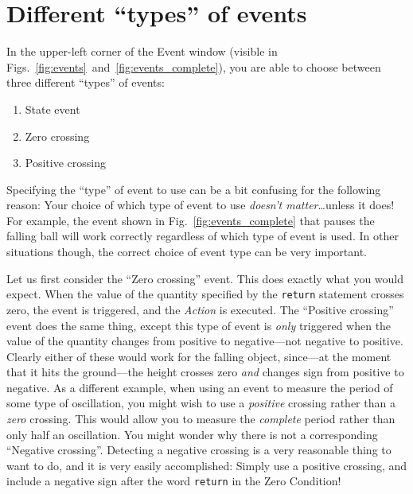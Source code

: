 \newpage
\section{Different ``types'' of events}

In the upper-left corner of the Event window (visible in Figs.~\ref{fig:events}~and~\ref{fig:events_complete}), you are able to choose between three different ``types'' of events:
\begin{enumerate}
\item State event
\item Zero crossing
\item Positive crossing
\end{enumerate}

Specifying the ``type'' of event to use can be a bit confusing for the following reason:  Your choice of which type of event to use \emph{doesn't matter}\ldots unless it does!  For example, the event shown in Fig.~\ref{fig:events_complete} that pauses the falling ball will work correctly regardless of which type of event is used.  In other situations though, the correct choice of event type can be very important.

Let us first consider the ``Zero crossing'' event.  This does exactly what you would expect.  When the value of the quantity specified by the \verb+return+ statement crosses zero, the event is triggered, and the \emph{Action} is executed.  The ``Positive crossing'' event does the same thing, except this type of event is \emph{only} triggered when the value of the quantity changes from positive to negative---not negative to positive.  Clearly either of these would work for the falling object, since---at the moment that it hits the ground---the height crosses zero \emph{and} changes sign from positive to negative.  As a different example, when using an event to measure the period of some type of oscillation, you might wish to use a \emph{positive} crossing rather than a \emph{zero} crossing.  This would allow you to measure the \emph{complete} period rather than only half an oscillation.  You might wonder why there is not a corresponding ``Negative crossing''.  Detecting a negative crossing is a very reasonable thing to want to do, and it is very easily accomplished:  Simply use a positive crossing, and include a negative sign after the word \verb+return+ in the Zero Condition!

